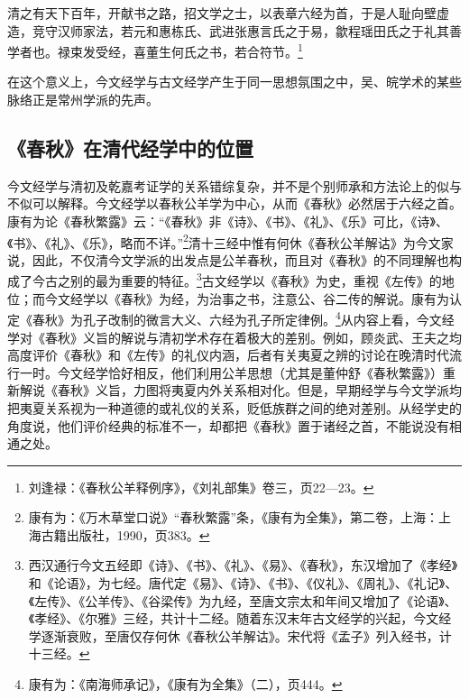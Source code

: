 \documentclass[a4paper, 12pt, openright]{ctexbook}
\renewenvironment{quote}
  {\list{}{\rightmargin2\ccwd \leftmargin2\ccwd \itemindent=2\ccwd \listparindent=2\ccwd}%
   \item\relax\small\kaishu\color{black}}
  {\endlist}
\begin{document}
\begin{quote}
清之有天下百年，开献书之路，招文学之士，以表章六经为首，于是人耻向壁虚造，竞守汉师家法，若元和惠栋氏、武进张惠言氏之于易，歙程瑶田氏之于礼其善学者也。禄束发受经，喜董生何氏之书，若合符节。\footnote{刘逢禄：《春秋公羊释例序》，《刘礼部集》卷三，页22—23。}
\end{quote}

在这个意义上，今文经学与古文经学产生于同一思想氛围之中，吴、皖学术的某些脉络正是常州学派的先声。

\subsection{《春秋》在清代经学中的位置}

今文经学与清初及乾嘉考证学的关系错综复杂，并不是个别师承和方法论上的似与不似可以解释。今文经学以春秋公羊学为中心，从而《春秋》必然居于六经之首。康有为论《春秋繁露》云：“《春秋》非《诗》、《书》、《礼》、《乐》可比，《诗》、《书》、《礼》、《乐》，略而不详。”\footnote{康有为：《万木草堂口说》“春秋繁露”条，《康有为全集》，第二卷，上海：上海古籍出版社，1990，页383。}清十三经中惟有何休《春秋公羊解诂》为今文家说，因此，不仅清今文学派的出发点是公羊春秋，而且对《春秋》的不同理解也构成了今古之别的最为重要的特征。\footnote{西汉通行今文五经即《诗》、《书》、《礼》、《易》、《春秋》，东汉增加了《孝经》和《论语》，为七经。唐代定《易》、《诗》、《书》、《仪礼》、《周礼》、《礼记》、《左传》、《公羊传》、《谷梁传》为九经，至唐文宗太和年间又增加了《论语》、《孝经》、《尔雅》三经，共计十二经。随着东汉末年古文经学的兴起，今文经学逐渐衰败，至唐仅存何休《春秋公羊解诂》。宋代将《孟子》列入经书，计十三经。}古文经学以《春秋》为史，重视《左传》的地位；而今文经学以《春秋》为经，为治事之书，注意公、谷二传的解说。康有为认定《春秋》为孔子改制的微言大义、六经为孔子所定律例。\footnote{康有为：《南海师承记》，《康有为全集》（二），页444。}从内容上看，今文经学对《春秋》义旨的解说与清初学术存在着极大的差别。例如，顾炎武、王夫之均高度评价《春秋》和《左传》的礼仪内涵，后者有关夷夏之辨的讨论在晚清时代流行一时。今文经学恰好相反，他们利用公羊思想（尤其是董仲舒《春秋繁露》）重新解说《春秋》义旨，力图将夷夏内外关系相对化。但是，早期经学与今文学派均把夷夏关系视为一种道德的或礼仪的关系，贬低族群之间的绝对差别。从经学史的角度说，他们评价经典的标准不一，却都把《春秋》置于诸经之首，不能说没有相通之处。
\end{document}
